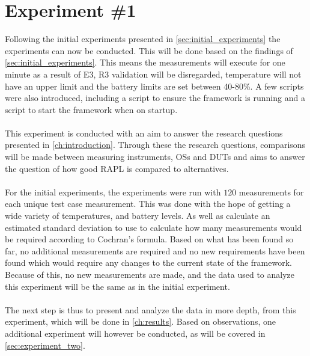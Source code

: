 \section{Experiment \#1}\label{sec:experiment_one}

Following the initial experiments presented in \cref{sec:initial_experiments} the experiments can now be conducted. This will be done based on the findings of \cref{sec:initial_experiments}. This means the measurements will execute for one minute as a result of E3, R3 validation will be disregarded, temperature will not have an upper limit and the battery limits are set between 40-80\%. A few scripts were also introduced, including a script to ensure the framework is running and a script to start the framework when on startup.

\paragraph*{}
This experiment is conducted with an aim to answer the research questions presented in \cref{ch:introduction}. Through these the research questions, comparisons will be made between measuring instruments, OSs and DUTs and aims to answer the question of how good RAPL is compared to alternatives.

\paragraph*{}
For the initial experiments, the experiments were run with $120$ measurements for each unique test case measurement. This was done with the hope of getting a wide variety of temperatures, and battery levels. As well as calculate an estimated standard deviation to use to calculate how many measurements would be required according to Cochran's formula. Based on what has been found so far, no additional measurements are required and no new requirements have been found which would require any changes to the current state of the framework. Because of this, no new measurements are made, and the data used to analyze this experiment will be the same as in the initial experiment.

\paragraph*{}
The next step is thus to present and analyze the data in more depth, from this experiment, which will be done in \cref{ch:results}. Based on observations, one additional experiment will however be conducted, as will be covered in \cref{sec:experiment_two}.